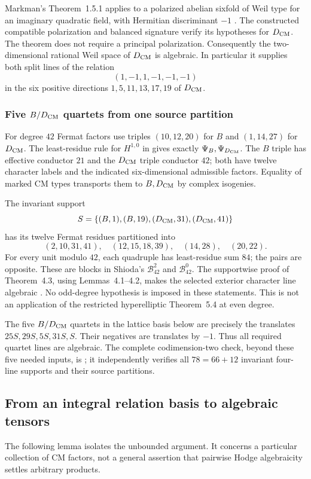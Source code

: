 Markman's Theorem~1.5.1 applies to a polarized abelian sixfold of Weil
type for an imaginary quadratic field, with Hermitian discriminant
$-1$ \cite[\S1.1 and Thm.~1.5.1]{Markman2025}. The constructed compatible
polarization and balanced signature verify its hypotheses for ${D_{\mathrm{CM}}}$.
The theorem does not require a principal polarization. Consequently the
two-dimensional rational Weil space of ${D_{\mathrm{CM}}}$ is algebraic. In particular
it supplies both split lines of the relation
\[
 (1,-1,1,-1,-1,-1)
\]
in the six positive directions $1,5,11,13,17,19$ of ${D_{\mathrm{CM}}}$.

\subsubsection{Five $B/{D_{\mathrm{CM}}}$ quartets from one source partition}
For degree $42$ Fermat factors use triples $(10,12,20)$ for $B$ and
$(1,14,27)$ for ${D_{\mathrm{CM}}}$. The least-residue rule for $H^{1,0}$ in
\cite[eq.~(2.1), p.~68]{Shioda1981} gives exactly $\Psi_B,\Psi_{D_{\mathrm{CM}}}$.
The $B$ triple has effective conductor $21$ and the ${D_{\mathrm{CM}}}$ triple conductor
$42$; both have twelve character labels and the indicated six-dimensional
admissible factors. Equality of marked CM types transports them to $B,{D_{\mathrm{CM}}}$
by complex isogenies.

The invariant support
\[
 S=\{(B,1),(B,19),({D_{\mathrm{CM}}},31),({D_{\mathrm{CM}}},41)\}
\]
has its twelve Fermat residues partitioned into
\[
 (2,10,31,41),\quad(12,15,18,39),\quad(14,28),\quad(20,22).
\]
For every unit modulo $42$, each quadruple has least-residue sum $84$;
the pairs are opposite. These are blocks in Shioda's
$\mathcal B_{42}^{2}$ and $\mathcal B_{42}^{0}$. The supportwise
proof of Theorem~4.3, using Lemmas~4.1--4.2, makes the selected exterior
character line algebraic \cite[pp.~70--72]{Shioda1981}. No odd-degree
hypothesis is imposed in these statements. This is not an application
of the restricted hyperelliptic Theorem~5.4 at even degree.

The five $B/{D_{\mathrm{CM}}}$ quartets in the lattice basis below are precisely the
translates $25S,\allowbreak 29S,\allowbreak 5S,\allowbreak 31S,\allowbreak S$. Their negatives are translates by $-1$.
Thus all required quartet lines are algebraic. The complete codimension-two
check, beyond these five needed inputs, is
; it independently verifies all
$78=66+12$ invariant four-line supports and their source partitions.

\subsection{From an integral relation basis to algebraic tensors}
The following lemma isolates the unbounded argument. It concerns a
particular collection of CM factors, not a general assertion that
pairwise Hodge algebraicity settles arbitrary products.

